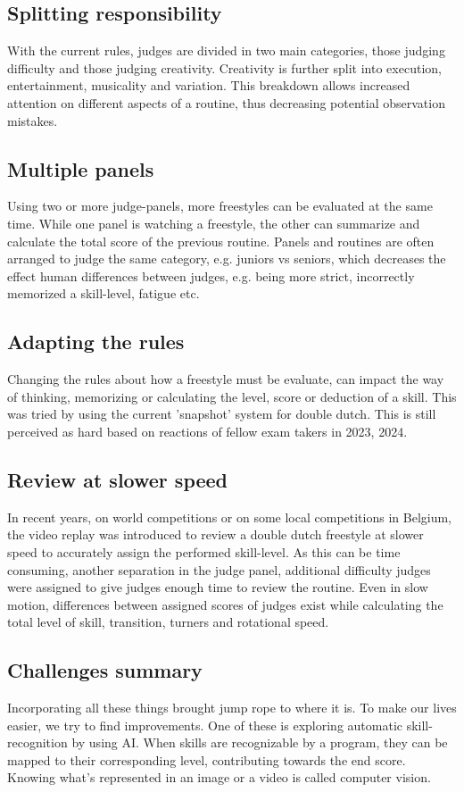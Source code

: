 \subsection{Splitting responsibility}
With the current rules, judges are divided in two main categories, those judging difficulty and those judging creativity. Creativity is further split into execution, entertainment, musicality and variation. This breakdown allows increased attention on different aspects of a routine, thus decreasing potential observation mistakes.

\subsection{Multiple panels}
Using two or more judge-panels, more freestyles can be evaluated at the same time. While one panel is watching a freestyle, the other can summarize and calculate the total score of the previous routine. Panels and routines are often arranged to judge the same category, e.g. juniors vs seniors, which decreases the effect human differences between judges, e.g. being more strict, incorrectly memorized a skill-level, fatigue etc.

\subsection{Adapting the rules}
Changing the rules about how a freestyle must be evaluate, can impact the way of thinking, memorizing or calculating the level, score or deduction of a skill. This was tried by using the current 'snapshot' system for double dutch. This is still perceived as hard based on reactions of fellow exam takers in 2023, 2024.

\subsection{Review at slower speed}
In recent years, on world competitions or on some local competitions in Belgium, the video replay was introduced to review a double dutch freestyle at slower speed to accurately assign the performed skill-level.
As this can be time consuming, another separation in the judge panel, additional difficulty judges were assigned to give judges enough time to review the routine. Even in slow motion, differences between assigned scores of judges exist while calculating the total level of skill, transition, turners and rotational speed.

\subsection{Challenges summary}
Incorporating all these things brought jump rope to where it is. To make our lives easier, we try to find improvements. One of these is exploring automatic skill-recognition by using AI. When skills are recognizable by a program, they can be mapped to their corresponding level, contributing towards the end score. Knowing what's represented in an image or a video is called computer vision. %

